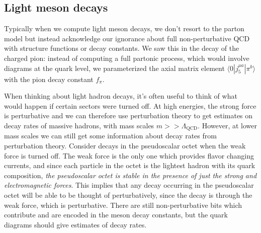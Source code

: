 \documentclass[11pt, oneside]{article}   	%
\theoremstyle{definition}
\numberwithin{equation}{subsection}		%
\begin{document}
\subsection{Light meson decays}

Typically when we compute light meson decays, we don't resort to the parton model but instead acknowledge our ignorance about 
full non-perturbative QCD with structure functions or decay constants. We saw this in the decay of the charged pion: instead of 
computing a full partonic process, which would involve diagrams at the quark level, we parameterized the axial matrix element $\langle 
0 | j_5^{\mu a} | \pi^b\rangle$ with the pion decay constant $f_\pi$. 

When thinking about light hadron decays, it's often useful to think of what would happen if certain sectors were turned off. At high energies, 
the strong force is perturbative and we can therefore use perturbation theory to get estimates on decay rates of massive hadrons, with mass 
scales $m >> \Lambda_\mathrm{QCD}$. However, at lower mass scales we can still get some information about decay rates from perturbation 
theory. Consider decays in the pseudoscalar octet when the weak force is turned off. The weak force is the only one which provides flavor 
changing currents, and since each particle in the octet is the lightest hadron with its quark composition, \textit{the pseudoscalar octet 
is stable in the presence of just the strong and electromagnetic forces}. This implies that any decay occurring in the pseudoscalar octet 
will be able to be thought of perturbatively, since the decay is through the weak force, which is perturbative. There are still non-perturbative 
bits which contribute and are encoded in the meson decay constants, but the quark diagrams should give estimates of decay rates. 
\end{document}
